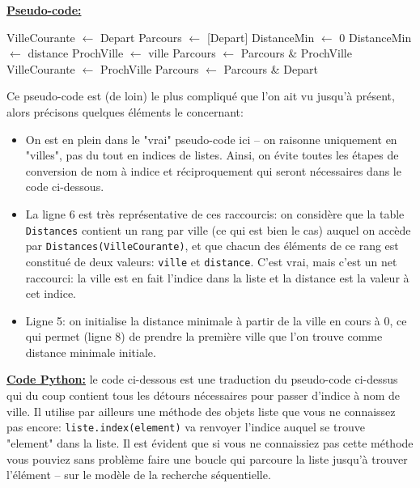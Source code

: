 \documentclass[12pt]{article}
\begin{document}
	\begin{MaReponse}
		\textbf{\uline{Pseudo-code:}}
		\begin{algorithmic}[1]
			\State VilleCourante $\leftarrow$ Depart
			\State Parcours $\leftarrow$ [Depart]
			\State DistanceMin $\leftarrow$ 0
			\State DistanceMin $\leftarrow$ distance
			\State ProchVille $\leftarrow$ ville
			\EndIf
			\EndIf
			\EndFor
			\State Parcours $\leftarrow$ Parcours \& ProchVille
			\State VilleCourante $\leftarrow$ ProchVille
			\EndWhile
			\State Parcours $\leftarrow$ Parcours \& Depart
			\State{}
			\EndFunction
		\end{algorithmic}
		
		Ce pseudo-code est (de loin) le plus compliqué que l'on ait vu jusqu'à présent, alors précisons quelques éléments le concernant:
		\begin{itemize}
			\item On est en plein dans le "vrai" pseudo-code ici -- on raisonne uniquement en "villes", pas du tout en indices de listes. Ainsi, on évite toutes les étapes de conversion de nom à indice et réciproquement qui seront nécessaires dans le code ci-dessous.
			\item La ligne 6 est très représentative de ces raccourcis: on considère que la table \texttt{Distances} contient un rang par ville (ce qui est bien le cas) auquel on accède par \texttt{Distances(VilleCourante)}, et que chacun des éléments de ce rang est constitué de deux valeurs: \texttt{ville} et \texttt{distance}. C'est vrai, mais c'est un net raccourci: la ville est en fait l'indice dans la liste et la distance est la valeur à cet indice.
			\item Ligne 5: on initialise la distance minimale à partir de la ville en cours à 0, ce qui permet (ligne 8) de prendre la première ville que l'on trouve comme distance minimale initiale.
		\end{itemize}
		
		\textbf{\uline{Code Python:}} le code ci-dessous est une traduction du pseudo-code ci-dessus qui du coup contient tous les détours nécessaires pour passer d'indice à nom de ville. Il utilise par ailleurs une méthode des objets liste que vous ne connaissez pas encore: \texttt{liste.index(element)} va renvoyer l'indice auquel se trouve "element" dans la liste. Il est évident que si vous ne connaissiez pas cette méthode vous pouviez sans problème faire une boucle qui parcoure la liste jusqu'à trouver l'élément -- sur le modèle de la recherche séquentielle.
		

\end{MaReponse}
\end{document}
